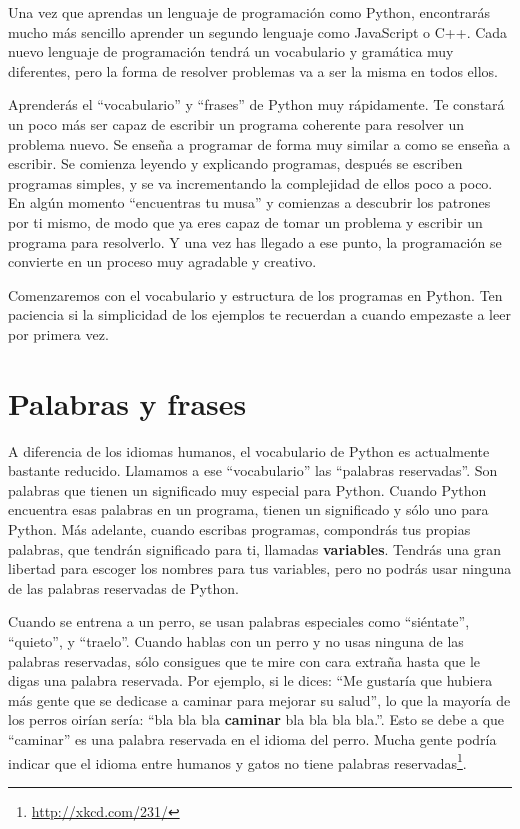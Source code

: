 Una vez que aprendas un lenguaje de programación como Python, encontrarás
mucho más sencillo aprender un segundo lenguaje como JavaScript o C++.
Cada nuevo lenguaje de programación tendrá un vocabulario y gramática muy
diferentes, pero la forma de resolver problemas
va a ser la misma en todos ellos.

Aprenderás el ``vocabulario'' y ``frases'' de Python muy rápidamente.
Te constará un poco más ser capaz de escribir un programa coherente
para resolver un problema nuevo. Se enseña a programar de forma muy similar
a como se enseña a escribir. Se comienza leyendo y explicando programas,
después se escriben programas simples, y se va incrementando la complejidad
de ellos poco a poco. En algún momento ``encuentras tu musa'' y comienzas
a descubrir los patrones por ti mismo, de modo que ya eres capaz de tomar un
problema y escribir un programa para resolverlo. Y una vez has llegado a ese
punto, la programación se convierte en un proceso muy agradable y creativo.

Comenzaremos con el vocabulario y estructura de los programas en Python. Ten
paciencia si la simplicidad de los ejemplos te recuerdan a cuando empezaste
a leer por primera vez.

\section{Palabras y frases}

A diferencia de los idiomas humanos, el vocabulario de Python es actualmente
bastante reducido. Llamamos a ese ``vocabulario'' las ``palabras reservadas''.
Son palabras que tienen un significado muy especial para Python. Cuando Python
encuentra esas palabras en un programa, tienen un significado y sólo uno para Python.
Más adelante, cuando escribas programas, compondrás tus propias palabras, que tendrán significado para ti, llamadas {\bf variables}. Tendrás una gran libertad para escoger los nombres para tus variables, pero no podrás usar ninguna de las palabras reservadas de Python.

Cuando se entrena a un perro, se usan palabras especiales como
``siéntate'', ``quieto'', y ``traelo''. Cuando hablas con un perro y
no usas ninguna de las palabras reservadas, sólo consigues que te mire
con cara extraña hasta que le digas una palabra reservada.
Por ejemplo, si le dices:
``Me gustaría que hubiera más gente que se dedicase a caminar para mejorar su salud'',
lo que la mayoría de los perros oirían sería:
``bla bla bla {\bf caminar} bla bla bla bla.''.
Esto se debe a que ``caminar'' es una palabra reservada en el idioma del perro.
Mucha gente podría indicar que el idioma entre humanos y gatos no tiene
palabras reservadas\footnote{\url{http://xkcd.com/231/}}.

